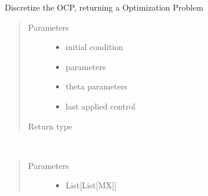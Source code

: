 \documentclass[letterpaper,10pt,english]{sphinxmanual}
\begin{document}
\begin{fulllineitems}
\begin{fulllineitems}
\end{fulllineitems}


\begin{fulllineitems}
\label{\detokenize{yaocptool.methods.classic:yaocptool.methods.classic.multipleshooting.MultipleShootingScheme.discretize}}
Discretize the OCP, returning a Optimization Problem
\begin{quote}\begin{description}
\item[{Parameters}] \leavevmode\begin{itemize}
\item {} 
 \textendash{} initial condition

\item {} 
 \textendash{} parameters

\item {} 
 \textendash{} theta parameters

\item {} 
 \textendash{} last applied control

\end{itemize}

\item[{Return type}] \leavevmode
{\hyperref[\detokenize{yaocptool.optimization:yaocptool.optimization.nonlinear_problem.NonlinearOptimizationProblem}]{}}

\end{description}\end{quote}

\end{fulllineitems}


\begin{fulllineitems}
\label{\detokenize{yaocptool.methods.classic:yaocptool.methods.classic.multipleshooting.MultipleShootingScheme.get_system_at_given_times}}~\begin{quote}\begin{description}
\item[{Parameters}] \leavevmode\begin{itemize}
\item {} 
 \textendash{} List{[}List{[}MX{]}{]}


\end{itemize}
\end{description}
\end{quote}
\end{fulllineitems}
\end{fulllineitems}
\end{document}
